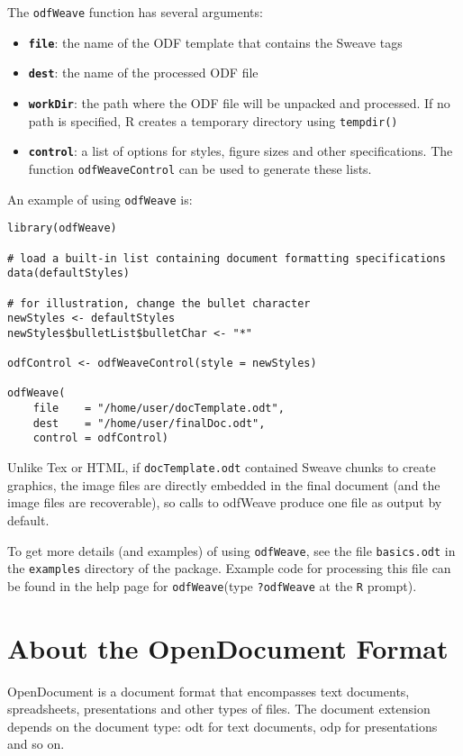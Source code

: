 \documentclass[12pt]{article}
\newcommand{\odfWeaveFunc}{{\tt odfWeave}\xspace}
\begin{document}
The \odfWeaveFunc function has several arguments:
\begin{itemize}
   \item {\bf \tt file}: the name of the ODF template that contains the Sweave tags
   \item {\bf \tt dest}: the name of the processed ODF file
   \item {\bf \tt workDir}: the path where the ODF file will be unpacked and processed. If no path is specified, R creates a temporary directory using \verb+tempdir()+
   \item {\bf \tt control}: a list of options for styles, figure sizes and other specifications. The function \verb+odfWeaveControl+ can be used to generate these lists.
\end{itemize}
An example of using \odfWeaveFunc is:
\begin{Verbatim}[fontsize=\footnotesize, frame=single, framesep=5mm, rulecolor=\color{blue}, samepage = true]
library(odfWeave)

# load a built-in list containing document formatting specifications
data(defaultStyles)

# for illustration, change the bullet character
newStyles <- defaultStyles
newStyles$bulletList$bulletChar <- "*"

odfControl <- odfWeaveControl(style = newStyles)
 
odfWeave(
	file    = "/home/user/docTemplate.odt", 
	dest    = "/home/user/finalDoc.odt", 
	control = odfControl)
\end{Verbatim}
Unlike Tex or HTML, if \texttt{docTemplate.odt} contained Sweave chunks to create graphics, the image files are directly embedded in the final document (and the image files are recoverable), so calls to odfWeave produce one file as output by default.

To get more details (and examples) of using \odfWeaveFunc, see the file \texttt{basics.odt} in the \texttt{examples} directory of the package. Example code for processing this file can be found in the help page for \odfWeaveFunc (type \verb+?odfWeave+ at the \texttt{R} prompt).
	
\section{About the OpenDocument Format}\label{S:odf}
	
OpenDocument is a document format that encompasses text documents, spreadsheets, presentations and other types of files. The document extension depends on the document type: odt for text documents, odp for presentations and so on.
\end{document}
